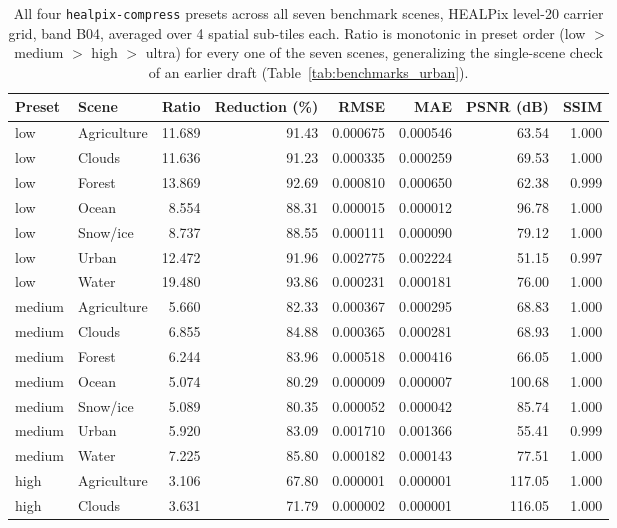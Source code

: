 \begin{table}[t]
\centering
\caption{All four \texttt{healpix-compress} presets across all seven benchmark scenes, HEALPix level-20 carrier grid, band B04, averaged over 4 spatial sub-tiles each. Ratio is monotonic in preset order (low $>$ medium $>$ high $>$ ultra) for every one of the seven scenes, generalizing the single-scene check of an earlier draft (Table~\ref{tab:benchmarks_urban}).}
\label{tab:full_preset_sweep}
\begin{tabular}{@{}llrrrrrr@{}}
\toprule
Preset & Scene & Ratio & Reduction (\%) & RMSE & MAE & PSNR (dB) & SSIM \\
\midrule
low    & Agriculture & 11.689 & 91.43 & 0.000675 & 0.000546 & 63.54    & 1.000 \\
low    & Clouds      & 11.636 & 91.23 & 0.000335 & 0.000259 & 69.53    & 1.000 \\
low    & Forest      & 13.869 & 92.69 & 0.000810 & 0.000650 & 62.38    & 0.999 \\
low    & Ocean       & 8.554  & 88.31 & 0.000015 & 0.000012 & 96.78    & 1.000 \\
low    & Snow/ice    & 8.737  & 88.55 & 0.000111 & 0.000090 & 79.12    & 1.000 \\
low    & Urban       & 12.472 & 91.96 & 0.002775 & 0.002224 & 51.15    & 0.997 \\
low    & Water       & 19.480 & 93.86 & 0.000231 & 0.000181 & 76.00    & 1.000 \\
\addlinespace
medium & Agriculture & 5.660  & 82.33 & 0.000367 & 0.000295 & 68.83    & 1.000 \\
medium & Clouds      & 6.855  & 84.88 & 0.000365 & 0.000281 & 68.93    & 1.000 \\
medium & Forest      & 6.244  & 83.96 & 0.000518 & 0.000416 & 66.05    & 1.000 \\
medium & Ocean       & 5.074  & 80.29 & 0.000009 & 0.000007 & 100.68   & 1.000 \\
medium & Snow/ice    & 5.089  & 80.35 & 0.000052 & 0.000042 & 85.74    & 1.000 \\
medium & Urban       & 5.920  & 83.09 & 0.001710 & 0.001366 & 55.41    & 0.999 \\
medium & Water       & 7.225  & 85.80 & 0.000182 & 0.000143 & 77.51    & 1.000 \\
\addlinespace
high   & Agriculture & 3.106  & 67.80 & 0.000001 & 0.000001 & 117.05   & 1.000 \\
high   & Clouds      & 3.631  & 71.79 & 0.000002 & 0.000001 & 116.05   & 1.000 \\

\end{tabular}
\end{table}
